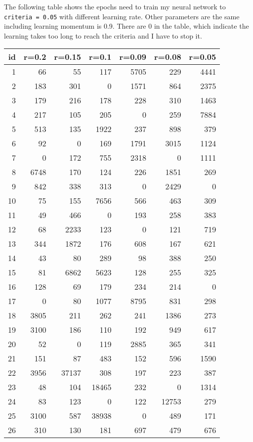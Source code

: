 \documentclass[11pt]{article}
\begin{document}
The following table shows the epochs need to train my neural network to \texttt{criteria = 0.05} with different learning rate. Other parameters are the same including learning momentum is 0.9. There are 0 in the table, which indicate the learning takes too long to reach the criteria and I have to stop it.

\begin{center}
\begin{tabular}{rrrrrrr}
id & r=0.2 & r=0.15 & r=0.1 & r=0.09 & r=0.08 & r=0.05\\
\hline
1 & 66 & 55 & 117 & 5705 & 229 & 4441\\
2 & 183 & 301 & 0 & 1571 & 864 & 2375\\
3 & 179 & 216 & 178 & 228 & 310 & 1463\\
4 & 217 & 105 & 205 & 0 & 259 & 7884\\
5 & 513 & 135 & 1922 & 237 & 898 & 379\\
6 & 92 & 0 & 169 & 1791 & 3015 & 1124\\
7 & 0 & 172 & 755 & 2318 & 0 & 1111\\
8 & 6748 & 170 & 124 & 226 & 1851 & 269\\
9 & 842 & 338 & 313 & 0 & 2429 & 0\\
10 & 75 & 155 & 7656 & 566 & 463 & 309\\
11 & 49 & 466 & 0 & 193 & 258 & 383\\
12 & 68 & 2233 & 123 & 0 & 121 & 719\\
13 & 344 & 1872 & 176 & 608 & 167 & 621\\
14 & 43 & 80 & 289 & 98 & 388 & 250\\
15 & 81 & 6862 & 5623 & 128 & 255 & 325\\
16 & 128 & 69 & 179 & 234 & 214 & 0\\
17 & 0 & 80 & 1077 & 8795 & 831 & 298\\
18 & 3805 & 211 & 262 & 241 & 1386 & 273\\
19 & 3100 & 186 & 110 & 192 & 949 & 617\\
20 & 52 & 0 & 119 & 2885 & 365 & 341\\
21 & 151 & 87 & 483 & 152 & 596 & 1590\\
22 & 3956 & 37137 & 308 & 197 & 223 & 387\\
23 & 48 & 104 & 18465 & 232 & 0 & 1314\\
24 & 83 & 123 & 0 & 122 & 12753 & 279\\
25 & 3100 & 587 & 38938 & 0 & 489 & 171\\
26 & 310 & 130 & 181 & 697 & 479 & 676\\

\end{tabular}
\end{center}
\end{document}
